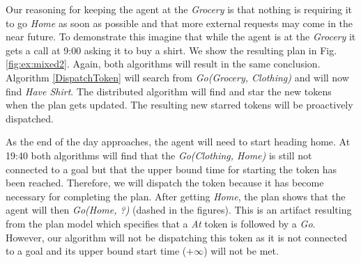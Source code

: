 Our reasoning for keeping the agent at the {\em Grocery} is that
nothing is requiring it to go {\em Home} as soon as possible and that
more external requests may come in the near future. To demonstrate
this imagine that while the agent is at the {\em Grocery} it gets a
call at 9:00 asking it to buy a shirt.  We show the resulting plan in
Fig. \ref{fig:ex:mixed2}. Again, both algorithms will result in the
same conclusion. Algorithm \ref{DispatchToken} will search from {\em
Go(Grocery, Clothing)} and will now find {\em Have Shirt}. The
distributed algorithm will find and star the new tokens when the plan
gets updated. The resulting new starred tokens will be proactively
dispatched.

As the end of the day approaches, the agent will need to start heading
home. At 19:40 both algorithms will find that the {\em Go(Clothing,
Home)} is still not connected to a goal but that the upper bound time
for starting the token has been reached. Therefore, we will dispatch
the token because it has become necessary for completing the plan.
After getting {\em Home}, the plan shows that the agent will then {\em
Go(Home, ?)} (dashed in the figures). This is an artifact resulting
from the plan model which specifies that a {\em At} token is followed by a {\em Go}. 
However, our algorithm will not be dispatching this token as 
it is not connected to a goal and its upper bound start time
($+\infty$) will not be met.



